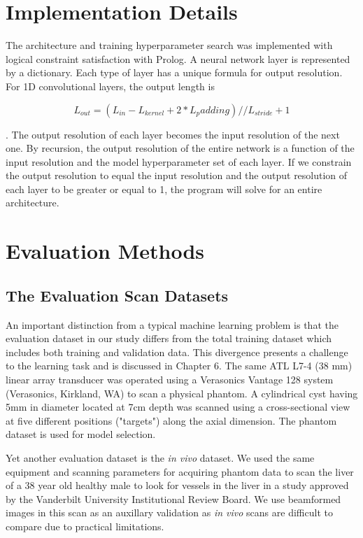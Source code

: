\section{Implementation Details}
The architecture and training hyperparameter search was implemented with logical constraint satisfaction with Prolog. A neural network layer is represented by a dictionary. Each type of layer has a unique formula for output resolution. For 1D convolutional layers, the output length is

$$
L_{out} = (L_{in} - L_{kernel} + 2 * L_padding) // L_{stride} + 1
$$

. The output resolution of each layer becomes the input resolution of the next one. By recursion, the output resolution of the entire network is a function of the input resolution and the model hyperparameter set of each layer. If we constrain the output resolution to equal the input resolution and the output resolution of each layer to be greater or equal to 1, the program will solve for an entire architecture.

\section{Evaluation Methods}

\subsection{The Evaluation Scan Datasets}

An important distinction from a typical machine learning problem is that the evaluation dataset in our study differs from the total training dataset which includes both training and validation data. This divergence presents a challenge to the learning task and is discussed in Chapter 6. The same ATL L7-4 (38 mm) linear array transducer was operated using a Verasonics Vantage 128 system (Verasonics, Kirkland, WA) to scan a physical phantom. A cylindrical cyst having 5mm in diameter located at 7cm depth was scanned using a cross-sectional view at five different positions ("targets") along the axial dimension. The phantom dataset is used for model selection.

Yet another evaluation dataset is the \textit{in vivo} dataset. We used the same equipment and scanning parameters for acquiring phantom data to scan the liver of a 38 year old healthy male to look for vessels in the liver in a study approved by the Vanderbilt University Institutional Review Board. We use beamformed images in this scan as an auxillary validation as \textit{in vivo} scans are difficult to compare due to practical limitations.

